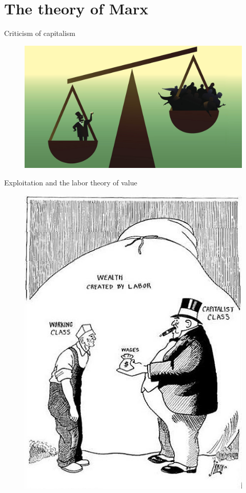\documentclass{beamer}
\begin{document}
\section{The theory of Marx}
\begin{frame}{Criticism of capitalism} %
    \begin{figure}
        \centering
        \includegraphics[width=\textwidth]{../img/class.jpg}
        \label{fig:class}
    \end{figure}{}
\end{frame}

\begin{frame}{Exploitation and the labor theory of value}

	\begin{figure}[htpb]
		\centering
		\includegraphics[width=0.6\linewidth]{../img/explot.png}
		\label{fig:exploit}
	\end{figure}

\end{frame}
\end{document}
